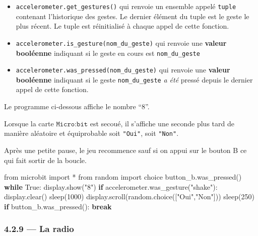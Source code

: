 \documentclass[a4paper,17pt]{extarticle}
\providecommand{\tightlist}{%
      \setlength{\itemsep}{0pt}\setlength{\parskip}{0pt}}
\newenvironment{Shaded}{}{}
\newcommand{\DecValTok}[1]{\textcolor[rgb]{0.25,0.63,0.44}{{#1}}}
\newcommand{\StringTok}[1]{\textcolor[rgb]{0.25,0.44,0.63}{{#1}}}
\newcommand{\NormalTok}[1]{{#1}}
\newcommand{\ImportTok}[1]{{#1}}
\newcommand{\VariableTok}[1]{\textcolor[rgb]{0.10,0.09,0.49}{{#1}}}
\newcommand{\ControlFlowTok}[1]{\textcolor[rgb]{0.00,0.44,0.13}{\textbf{{#1}}}}
\newcommand{\OperatorTok}[1]{\textcolor[rgb]{0.40,0.40,0.40}{{#1}}}
\begin{document}
\begin{itemize}
\tightlist
\item
  \texttt{accelerometer.get\_gestures()} qui renvoie un ensemble appelé
  \texttt{tuple} contenant l'historique des gestes. Le dernier élément
  du tuple est le geste le plus récent. Le tuple est réinitialisé à
  chaque appel de cette fonction.
\item
  \texttt{accelerometer.is\_gesture(nom\_du\_geste)} qui renvoie une
  \textbf{valeur booléenne} indiquant si le geste en cours est
  \texttt{nom\_du\_geste}
\item
  \texttt{accelerometer.was\_pressed(nom\_du\_geste)} qui renvoie une
  \textbf{valeur booléenne} indiquant si le geste
  \texttt{nom\_du\_geste} \emph{a été} pressé depuis le dernier appel de
  cette fonction.
\end{itemize}
\begin{exemple}
    Le programme ci-dessous affiche le nombre ``8''.

Lorsque la carte \(\texttt{Micro:bit}\) est secoué, il s'affiche une
seconde plus tard de manière aléatoire et équiprobable soit
\texttt{"Oui"}, soit \texttt{"Non"}.

Après une petite pause, le jeu recommence sauf si on appui sur le bouton
B ce qui fait sortir de la boucle.

\begin{Shaded}
\begin{Highlighting}[]
\ImportTok{from}\NormalTok{ microbit }\ImportTok{import} \OperatorTok{*}
\ImportTok{from}\NormalTok{ random }\ImportTok{import}\NormalTok{ choice}
\NormalTok{button\_b.was\_pressed()}
\ControlFlowTok{while} \VariableTok{True}\NormalTok{:}
\NormalTok{    display.show(}\StringTok{"8"}\NormalTok{)}
    \ControlFlowTok{if}\NormalTok{ accelerometer.was\_gesture(}\StringTok{"shake"}\NormalTok{):}
\NormalTok{        display.clear()}
\NormalTok{        sleep(}\DecValTok{1000}\NormalTok{)}
\NormalTok{        display.scroll(random.choice([}\StringTok{"Oui"}\NormalTok{,}\StringTok{"Non"}\NormalTok{]))}
\NormalTok{        sleep(}\DecValTok{250}\NormalTok{)}
    \ControlFlowTok{if}\NormalTok{ button\_b.was\_pressed():}
        \ControlFlowTok{break}
\end{Highlighting}
\end{Shaded}

        \end{exemple}
    \hypertarget{la-radio}{%
\subsubsection{4.2.9 --- La radio}\label{la-radio}}
\end{document}
